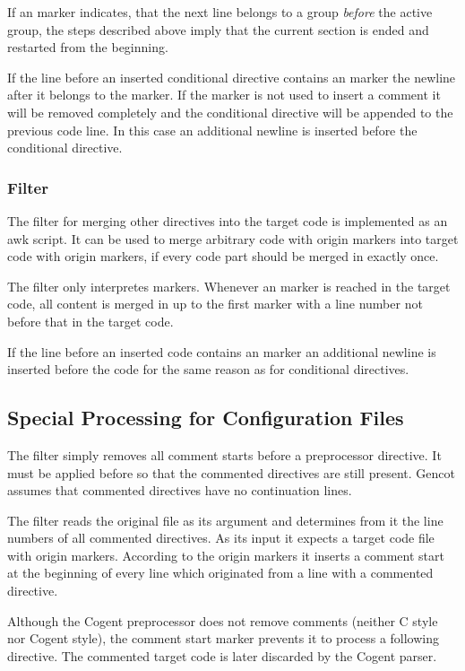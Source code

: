 If an  marker indicates, that the next line belongs to a group \textit{before} the active group, the
steps described above imply that the current section is ended and restarted from the beginning.

If the line before an inserted conditional directive contains an  marker the newline after it belongs
to the marker. If the marker is not used to insert a comment it will be removed completely and the conditional
directive will be appended to the previous code line. In this case an additional newline is inserted before 
the conditional directive.

\subsubsection{Filter }

The filter for merging other directives into the target code is implemented as an awk script. It can be used to 
merge arbitrary code with origin markers into target code with origin markers, if every code part should be
merged in exactly once.

The filter only interpretes  markers. Whenever an  marker is reached in the target
code, all content is merged in up to the first  marker with a line number not before that in the target
code.

If the line before an inserted code contains an  marker an additional newline is inserted before 
the code for the same reason as for conditional directives.

\subsection{Special Processing for Configuration Files}
\label{impl-preprocessor-config}

The filter  simply removes all \code{//} comment starts before a preprocessor directive.
It must be applied before  so that the commented directives are still present. Gencot 
assumes that commented directives have no continuation lines.

The filter  reads the original file as its argument and determines from it the
line numbers of all commented directives. As its input it expects a target code file with origin markers.
According to the origin markers it inserts a \code{-{}-} comment start at the beginning of every line which
originated from a line with a commented directive. 

Although the Cogent preprocessor does not remove comments (neither C style nor Cogent style), the comment start
marker prevents it to process a following directive. The commented target code is later discarded by the Cogent 
parser.

